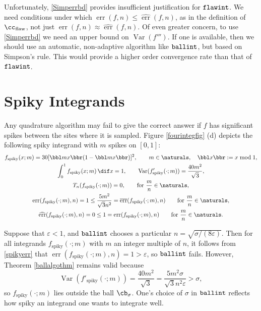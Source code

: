 \documentclass[]{article}
\DeclareMathOperator{\flawinteg}{\texttt{\textup{flawint}}}
\DeclareMathOperator{\ballinteg}{\texttt{\textup{ballint}}}
\DeclareMathOperator{\Var}{Var}
\DeclareMathOperator{\err}{err}
\newcommand{\oerr}{\overline{\err}}
\newcommand{\herr}{\widehat{\err}}
\theoremstyle{definition}
\theoremstyle{remark}
\begin{document}
Unfortunately, \eqref{Simperrbd} provides insufficient justification for $\flawinteg$.  We  need conditions under which $\err(f,n) \le \herr(f,n)$, as in the definition of $\cc_{\text{flaw}}$, not just  $ \err(f,n) \approx \herr(f,n)$.   Of even greater concern, to use \eqref{Simperrbd} we  need an upper bound on $\Var(f''')$.   If one is available, then we should use an automatic, non-adaptive algorithm like $\ballinteg$, but based on Simpson's rule.  This would provide a higher order convergence rate than that of $\flawinteg$.

\section{Spiky Integrands} \label{spikysec}

Any quadrature algorithm may fail to give the correct answer if $f$ has significant spikes between the sites where it is sampled.  Figure \ref{fourintegfig} (d) depicts the following spiky integrand with $m$ spikes on $[0,1]$:
\begin{subequations} \label{spiky}
\begin{gather}
f_{\text{spiky}}(x;m) = 30[\bbl m x \bbr(1-\bbl m x \bbr)]^2, \qquad m \in \naturals, \quad \bbl x \bbr := x \bmod 1, \\
\int_0^1 f_{\text{spiky}}(x;m) \, \dif x = 1, \qquad \Var(f'_{\text{spiky}}(\cdot;m))= \frac{40m^2}{\sqrt{3}},\\
T_n(f_{\text{spiky}}(\cdot;m))=0, \qquad 
\text{for } \frac{m} {n} \in \naturals, \\
\label{spikyerr}
\err(f_{\text{spiky}}(\cdot;m),n)=1 \le \frac{5m^2}{\sqrt{3}n^2} = \oerr(f_{\text{spiky}}(\cdot;m),n) \qquad 
\text{for } \frac{m}{n} \in \naturals, \\
\label{spikyerrest}
\herr(f_{\text{spiky}}(\cdot;m),n)=0 \le 1 =  \err(f_{\text{spiky}}(\cdot;m),n) \qquad 
\text{for } \frac{m}{n} \in \naturals.
\end{gather}
\end{subequations}

Suppose that $\varepsilon<1$, and $\ballinteg$ chooses a particular $n=\sqrt{\sigma/(8\varepsilon)}$.  Then for all integrands $f_{\text{spiky}}(\cdot;m)$ with $m$ an integer multiple of $n$, it follows from \eqref{spikyerr} that $\err(f_{\text{spiky}}(\cdot;m),n)=1 > \varepsilon$, so $\ballinteg$ fails.  However, Theorem \ref{ballalgothm} remains valid because 
\[
\Var(f'_{\text{spiky}}(\cdot;m))= \frac{40m^2}{\sqrt{3}} = \frac{5m^2\sigma }{\sqrt{3}n^2 \varepsilon} > \sigma,
\]
so $f_{\text{spiky}}(\cdot;m)$ lies outside the ball $\cb_{\sigma}$.  One's choice of $\sigma$ in $\ballinteg$ reflects how spiky an integrand one wants to integrate well.
\end{document}
